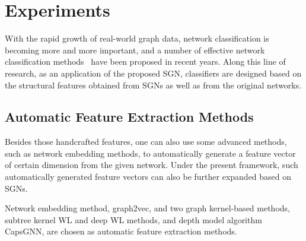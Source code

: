 \documentclass[10pt,journal,compsoc]{IEEEtran}
\begin{document}
\section{Experiments}\label{sec:Exp}

With the rapid growth of real-world graph data, network classification is becoming more and more important, and a number of effective network classification methods~\cite{joachims2009predicting,kudo2005application,zhao2018substructure} have been proposed in recent years. Along this line of research, as an application of the proposed SGN, classifiers are designed based on the structural features obtained from SGNs as well as from the original networks.

\subsection{Automatic Feature Extraction Methods}

Besides those handcrafted features, one can also use some advanced methods, such as network embedding methods, to automatically generate a feature vector of certain dimension from the given network. Under the present framework, such automatically generated feature vectors can also be further expanded based on SGNs.

Network embedding method, graph2vec, and two graph kernel-based methods, subtree kernel WL and deep WL methods, and depth model algorithm CapsGNN, are chosen as automatic feature extraction methods.
\end{document}
